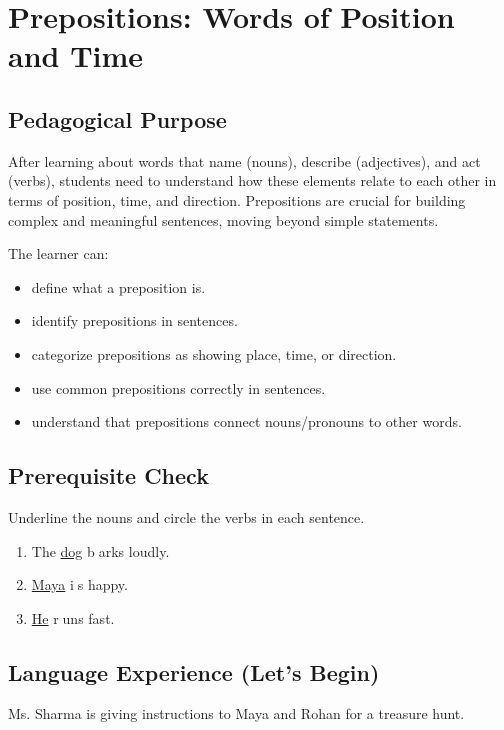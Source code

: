 
\chapter{Prepositions: Words of Position and Time}

\section{Pedagogical Purpose}
After learning about words that name (nouns), describe (adjectives), and act (verbs), students need to understand how these elements relate to each other in terms of position, time, and direction. Prepositions are crucial for building complex and meaningful sentences, moving beyond simple statements.

\begin{learningobjectives}
The learner can:
\begin{itemize}
    \item define what a preposition is.
    \item identify prepositions in sentences.
    \item categorize prepositions as showing place, time, or direction.
    \item use common prepositions correctly in sentences.
    \item understand that prepositions connect nouns/pronouns to other words.
\end{itemize}
\end{learningobjectives}

\section{Prerequisite Check}
\begin{quickcheck}
Underline the nouns and circle the verbs in each sentence.
\begin{enumerate}
    \item The \underline{dog} \textcircled{barks} loudly.
    \item \underline{Maya} \textcircled{is} happy.
    \item \underline{He} \textcircled{runs} fast.
\end{enumerate}
\end{quickcheck}

\section{Language Experience (Let's Begin)}
Ms. Sharma is giving instructions to Maya and Rohan for a treasure hunt.

